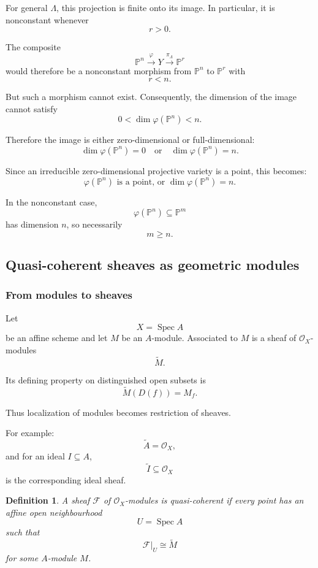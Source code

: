 \documentclass[12pt,a4paper]{article}
\DeclareMathOperator{\Spec}{Spec}
\newcommand{\OO}{\mathcal{O}}
\providecommand{\Spec}{\operatorname{Spec}}
\providecommand{\Pj}{\mathbb P}
\theoremstyle{notespace}
\newtheorem{definition}{Definition}[subsection]
\begin{document}
For general \(\Lambda\), this projection is finite onto its image. In particular, it is nonconstant whenever
\[
r>0.
\]

The composite
\[
\Pj^n
\xrightarrow{\varphi}
Y
\xrightarrow{\pi_{\Lambda}}
\Pj^r
\]
would therefore be a nonconstant morphism from \(\Pj^n\) to \(\Pj^r\) with
\[
r<n.
\]

But such a morphism cannot exist. Consequently, the dimension of the image cannot satisfy
\[
0<\dim \varphi(\Pj^n)<n.
\]

Therefore the image is either zero-dimensional or full-dimensional:
\[
\boxed{
	\dim\varphi(\Pj^n)=0
	\quad\text{or}\quad
	\dim\varphi(\Pj^n)=n.
}
\]

Since an irreducible zero-dimensional projective variety is a point, this becomes:
\[
\boxed{
	\varphi(\Pj^n)\text{ is a point, or }
	\dim\varphi(\Pj^n)=n.
}
\]

In the nonconstant case,
\[
\varphi(\Pj^n)\subseteq\Pj^m
\]
has dimension \(n\), so necessarily
\[
m\geq n.
\]

\subsection{Quasi-coherent sheaves as geometric modules}

\subsubsection{From modules to sheaves}

Let
\[
X=\Spec A
\]
be an affine scheme and let \(M\) be an \(A\)-module. Associated to \(M\) is a sheaf of \(\OO_X\)-modules
\[
\widetilde{M}.
\]

Its defining property on distinguished open subsets is
\[
\widetilde{M}(D(f))=M_f.
\]

Thus localization of modules becomes restriction of sheaves.

For example:
\[
\widetilde{A}=\OO_X,
\]
and for an ideal \(I\subseteq A\),
\[
\widetilde{I}\subseteq \OO_X
\]
is the corresponding ideal sheaf.

\begin{definition}
	A sheaf \(\mathcal{F}\) of \(\OO_X\)-modules is \emph{quasi-coherent} if every point has an affine open neighbourhood
	\[
	U=\Spec A
	\]
	such that
	\[
	\mathcal{F}|_U\cong\widetilde{M}
	\]
	for some \(A\)-module \(M\).
\end{definition}
\end{document}

